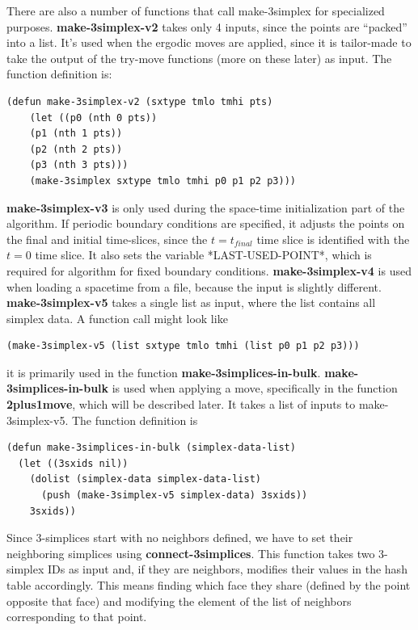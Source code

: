 \documentclass[12pt]{article}
\begin{document}
There are also a number of functions that call make-3simplex for
specialized purposes. \textbf{make-3simplex-v2} takes only 4 inputs,
since the points are ``packed'' into a list. It's used when the
ergodic moves are applied, since it is tailor-made to take the output
of the try-move functions (more on these later) as input. The function
definition is:
\begin{lstlisting}
(defun make-3simplex-v2 (sxtype tmlo tmhi pts)
    (let ((p0 (nth 0 pts))
	(p1 (nth 1 pts))
	(p2 (nth 2 pts))
	(p3 (nth 3 pts)))
    (make-3simplex sxtype tmlo tmhi p0 p1 p2 p3)))
\end{lstlisting}
\textbf{make-3simplex-v3} is only used during the space-time
initialization part of the algorithm. If periodic boundary conditions
are specified, it adjusts the points on the final and initial
time-slices, since the $t=t_{final}$ time slice is identified with the
$t=0$ time slice. It also sets the variable *LAST-USED-POINT*, which
is required for algorithm for fixed boundary
conditions. \textbf{make-3simplex-v4} is used when loading a spacetime
from a file, because the input is slightly
different. \textbf{make-3simplex-v5} takes a single list as input,
where the list contains all simplex data. A function call might look like
\begin{lstlisting}
(make-3simplex-v5 (list sxtype tmlo tmhi (list p0 p1 p2 p3)))
\end{lstlisting}
it is primarily used in the function
\textbf{make-3simplices-in-bulk}. \textbf{make-3simplices-in-bulk} is
used when applying a move, specifically in the function
\textbf{2plus1move}, which will be described later. It takes a list of
inputs to make-3simplex-v5. The function definition is
\begin{lstlisting}
(defun make-3simplices-in-bulk (simplex-data-list)
  (let ((3sxids nil))
    (dolist (simplex-data simplex-data-list)
      (push (make-3simplex-v5 simplex-data) 3sxids))
    3sxids))
\end{lstlisting}

Since 3-simplices start with no neighbors defined, we have to set
their neighboring simplices using \textbf{connect-3simplices}. This
function takes two 3-simplex IDs as input and, if they are neighbors,
modifies their values in the hash table accordingly. This means
finding which face they share (defined by the point opposite that
face) and modifying the element of the list of neighbors corresponding
to that point.
\end{document}
